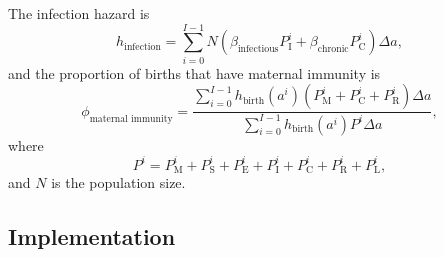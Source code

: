 \documentclass[12pt]{article}
\begin{document}
The infection hazard is
\begin{equation}
  h_{\text{infection}}
  = \sum_{i = 0}^{I - 1} N
  \left(
    \beta_{\text{infectious}} P_{\mathrm{I}}^i
    + \beta_{\text{chronic}} P_{\mathrm{C}}^i
  \right)
  \Delta a,
\end{equation}
and the proportion of births that have maternal immunity is
\begin{equation}
  \phi_{\text{maternal immunity}}
  = \frac{
    \sum_{i = 0}^{I - 1}
    h_{\text{birth}}(a^i) \left(
      P_{\mathrm{M}}^i + P_{\mathrm{C}}^i + P_{\mathrm{R}}^i
    \right)
    \Delta a
  }{
    \sum_{i = 0}^{I - 1} h_{\text{birth}}(a^i) P^i \Delta a
  },
\end{equation}
where
\begin{equation}
  P^i =  P_{\mathrm{M}}^i + P_{\mathrm{S}}^i + P_{\mathrm{E}}^i
  + P_{\mathrm{I}}^i + P_{\mathrm{C}}^i + P_{\mathrm{R}}^i + P_{\mathrm{L}}^i,
\end{equation}
and $N$ is the population size.


\subsection{Implementation}
\end{document}
